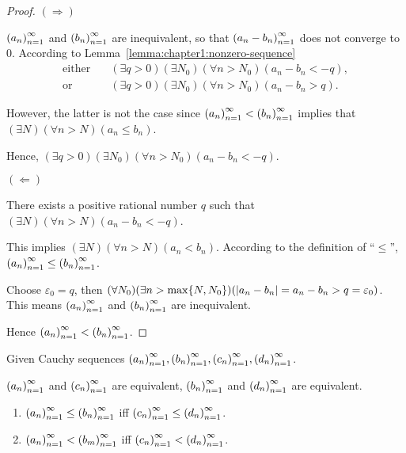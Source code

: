 \begin{proof}
    $(\Rightarrow)$

    ${\left({a_{n}}\right)}^{\infty}_{n=1}$ and ${\left({b_{n}}\right)}^{\infty}_{n=1}$ are inequivalent, so that ${\left({a_{n} - b_{n}}\right)}^{\infty}_{n=1}$ does not converge to $0$. According to Lemma~\ref{lemma:chapter1:nonzero-sequence}
    \begin{align*}
        \text{either}\quad & (\exists q > 0)(\exists N_{0})(\forall n > N_{0})(a_{n} - b_{n} < -q), \\
        \text{or}\quad     & (\exists q > 0)(\exists N_{0})(\forall n > N_{0})(a_{n} - b_{n} > q).
    \end{align*}

    However, the latter is not the case since ${\left({a_{n}}\right)}^{\infty}_{n=1} < {\left({b_{n}}\right)}^{\infty}_{n=1}$ implies that $(\exists N)(\forall n > N)(a_{n}\le b_{n})$.

    Hence, $(\exists q > 0)(\exists N_{0})(\forall n > N_{0})(a_{n} - b_{n} < -q)$.

    \bigskip
    $(\Leftarrow)$

    There exists a positive rational number $q$ such that $(\exists N)(\forall n > N)(a_{n} - b_{n} < -q)$.

    This implies $(\exists N)(\forall n > N)(a_{n} < b_{n})$. According to the definition of ``$\le$'', ${\left({a_{n}}\right)}^{\infty}_{n=1} \le {\left({b_{n}}\right)}^{\infty}_{n=1}$.

    Choose $\varepsilon_{0} = q$, then $(\forall N_{0})(\exists n > \max\{ N, N_{0} \})(\left\vert{a_{n} - b_{n}}\right\vert = a_{n} - b_{n} > q = \varepsilon_{0})$. This means ${\left({a_{n}}\right)}^{\infty}_{n=1}$ and ${\left({b_{n}}\right)}^{\infty}_{n=1}$ are inequivalent.

    Hence ${\left({a_{n}}\right)}^{\infty}_{n=1} < {\left({b_{n}}\right)}^{\infty}_{n=1}$.
\end{proof}

\begin{theorem}\label{theorem:chapter1:equivalent-cauchy-sequences-and-order}
    Given Cauchy sequences ${\left({a_{n}}\right)}^{\infty}_{n=1}, {\left({b_{n}}\right)}^{\infty}_{n=1}, {\left({c_{n}}\right)}^{\infty}_{n=1}, {\left({d_{n}}\right)}^{\infty}_{n=1}$.

    ${\left({a_{n}}\right)}^{\infty}_{n=1}$ and ${\left({c_{n}}\right)}^{\infty}_{n=1}$ are equivalent, ${\left({b_{n}}\right)}^{\infty}_{n=1}$ and ${\left({d_{n}}\right)}^{\infty}_{n=1}$ are equivalent.

    \begin{enumerate}[label={(\roman*)}]
        \item ${\left({a_{n}}\right)}^{\infty}_{n=1}\le{\left({b_{n}}\right)}^{\infty}_{n=1}$ iff ${\left({c_{n}}\right)}^{\infty}_{n=1}\le{\left({d_{n}}\right)}^{\infty}_{n=1}$.
        \item ${\left({a_{n}}\right)}^{\infty}_{n=1} < {\left({b_{m}}\right)}^{\infty}_{n=1}$ iff ${\left({c_{n}}\right)}^{\infty}_{n=1} < {\left({d_{n}}\right)}^{\infty}_{n=1}$.
    \end{enumerate}
\end{theorem}

